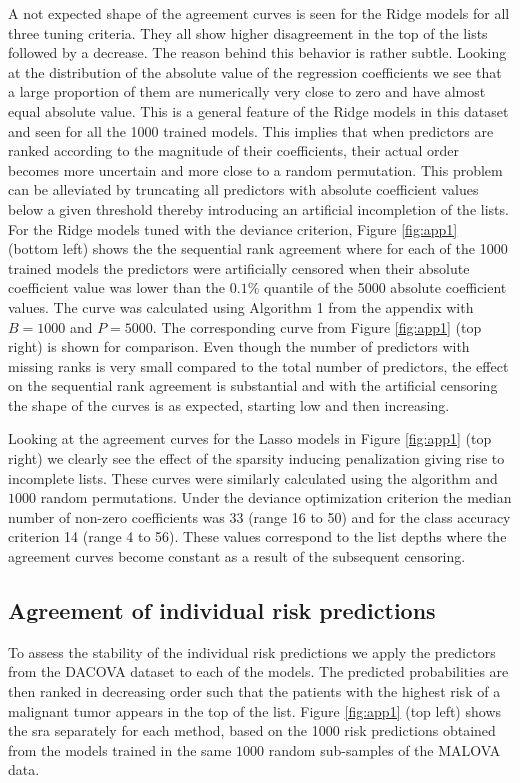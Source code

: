 \documentclass[oupdraft]{bio}
\begin{document}
A not expected shape of the agreement curves is seen for the Ridge
models for all three tuning criteria. They all show higher
disagreement in the top of the lists followed by a decrease. The
reason behind this behavior is rather subtle. Looking at the
distribution of the absolute value of the regression coefficients we
see that a large proportion of them are numerically very close to zero
and have almost equal absolute value. This is a general feature of the
Ridge models in this dataset and seen for all the 1000 trained models.
This implies that when predictors are ranked according to the
magnitude of their coefficients, their actual order becomes more
uncertain and more close to a random permutation. This problem can be
alleviated by truncating all predictors with absolute coefficient
values below a given threshold thereby introducing an artificial
incompletion of the lists.  For the Ridge models tuned with the
deviance criterion, Figure \ref{fig:app1} (bottom left) shows the the
sequential rank agreement where for each of the 1000 trained models
the predictors were artificially censored when their absolute
coefficient value was lower than the $0.1\%$ quantile of the 5000
absolute coefficient values. The curve was calculated using Algorithm
1 from the appendix with $B=1000$ and $P=5000$. The corresponding
curve from Figure \ref{fig:app1} (top right) is shown for
comparison.  Even though the number of predictors with missing ranks is very
small compared to the total number of predictors, the effect on the
sequential rank agreement is substantial and with the artificial
censoring the shape of the curves is as expected, starting low and
then increasing. 

Looking at the agreement curves for the Lasso models in Figure
\ref{fig:app1} (top right) we clearly see the effect of the sparsity
inducing penalization giving rise to incomplete lists. These curves
were similarly calculated using the algorithm and $1000$ random
permutations. Under the deviance optimization criterion the median
number of non-zero coefficients was 33 (range 16 to 50) and for the
class accuracy criterion 14 (range 4 to 56). These values correspond
to the list depths where the agreement curves become constant as a
result of the subsequent censoring.




\subsection{Agreement of individual risk predictions}
\label{sec:airp}
To assess the stability of the individual risk predictions we apply
the predictors from the DACOVA dataset to each of the models. The
predicted probabilities are then ranked in decreasing order such that
the patients with the highest risk of a malignant tumor appears in the
top of the list. Figure \ref{fig:app1} (top left) shows the sra separately
for each method, based on the 1000 risk predictions obtained from the
models trained in the same $1000$ random sub-samples of the MALOVA
data.
\end{document}
